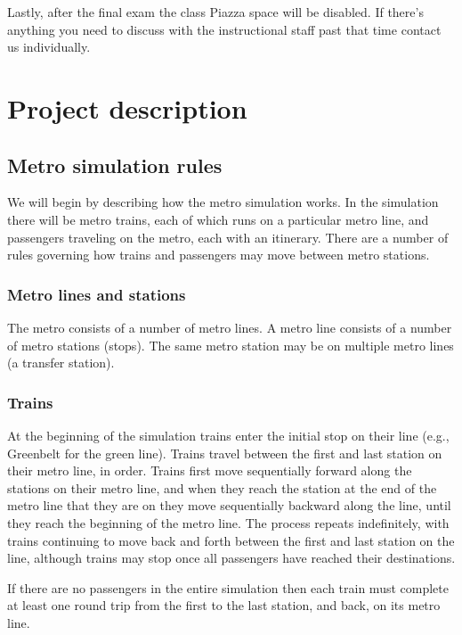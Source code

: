 \documentclass[11pt]{article}
\begin{document}
      Lastly, after the final exam the class Piazza space will be disabled.
    If there's anything you need to discuss with the instructional staff
    past that time contact us individually.

  \section{Project description}

    \subsection{Metro simulation rules}

      We will begin by describing how the metro simulation works.  In the
    simulation there will be metro trains, each of which runs on a
    particular metro line, and passengers traveling on the metro, each with
    an itinerary.  There are a number of rules governing how trains and
    passengers may move between metro stations.

      \subsubsection{Metro lines and stations}

        The metro consists of a number of metro lines.  A metro line consists
      of a number of metro stations (stops).  The same metro station may be
      on multiple metro lines (a transfer station).

      \subsubsection{Trains}

        At the beginning of the simulation trains enter the initial stop on
      their line (e.g., Greenbelt for the green line).  Trains travel
      between the first and last station on their metro line, in order.
      Trains first move sequentially forward along the stations on their
      metro line, and when they reach the station at the end of the metro
      line that they are on they move sequentially backward along the line,
      until they reach the beginning of the metro line.  The process repeats
      indefinitely, with trains continuing to move back and forth between
      the first and last station on the line, although trains may stop once
      all passengers have reached their destinations.

        If there are no passengers in the entire simulation then each train
      must complete at least one round trip from the first to the last
      station, and back, on its metro line.
\end{document}
